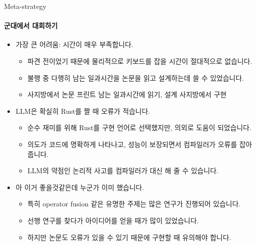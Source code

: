 \begin{frame}{Meta-strategy}
\framesubtitle{군대에서 대회하기}

\begin{itemize}
  \item 가장 큰 어려움: 시간이 매우 부족합니다.
  \begin{itemize}
    \item 파견 전이었기 때문에 물리적으로 키보드를 잡을 시간이 절대적으로 없습니다.
    \item 불행 중 다행히 남는 일과시간을 논문을 읽고 설계하는데 쓸 수 있었습니다.
    \item 사지방에서 논문 프린트 \textrightarrow{} 남는 일과시간에 읽기, 설계 \textrightarrow{} 사지방에서 구현
  \end{itemize}
  \pause
  \item LLM은 확실히 Rust를 짤 때 오류가 적습니다.
  \begin{itemize}
    \item 순수 재미를 위해 Rust를 구현 언어로 선택했지만, 의외로 도움이 되었습니다.
    \item 의도가 코드에 명확하게 나타나고, 성능이 보장되면서 컴파일러가 오류를 잡아줍니다.
    \item LLM의 약점인 논리적 사고를 컴파일러가 대신 해 줄 수 있습니다.
  \end{itemize}
  \pause
  \item 아 이거 좋을것같은데 \textrightarrow{} 누군가 이미 했습니다.
  \begin{itemize}
    \item 특히 operator fusion 같은 유명한 주제는 많은 연구가 진행되어 있습니다.
    \item 선행 연구를 찾다가 아이디어를 얻을 때가 많이 있었습니다.
    \item 하지만 논문도 오류가 있을 수 있기 때문에 구현할 때 유의해야 합니다.
  \end{itemize}
\end{itemize}
\end{frame}